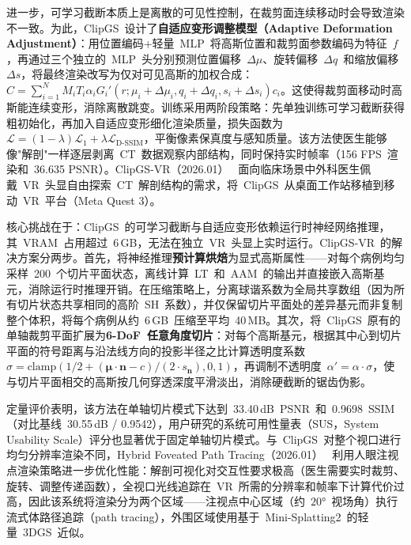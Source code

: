 进一步，可学习截断本质上是离散的可见性控制，在裁剪面连续移动时会导致渲染不一致。为此，ClipGS~设计了\textbf{自适应变形调整模型（Adaptive Deformation Adjustment）}：用位置编码+轻量~MLP~将高斯位置和裁剪面参数编码为特征~$f$，再通过三个独立的~MLP~头分别预测位置偏移~$\Delta\mu$、旋转偏移~$\Delta q$~和缩放偏移~$\Delta s$，将最终渲染改写为仅对可见高斯的加权合成：$C = \sum_{i=1}^{N} M_i T_i \alpha_i G_i'(r; \mu_i + \Delta\mu_i, q_i + \Delta q_i, s_i + \Delta s_i) c_i$。这使得裁剪面移动时高斯能连续变形，消除离散跳变。训练采用两阶段策略：先单独训练可学习截断获得粗初始化，再加入自适应变形细化渲染质量，损失函数为~$\mathcal{L} = (1-\lambda)\mathcal{L}_1 + \lambda \mathcal{L}_{\text{D-SSIM}}$，平衡像素保真度与感知质量。该方法使医生能够像"解剖"一样逐层剥离~CT~数据观察内部结构，同时保持实时帧率（156 FPS~渲染和~36.635 PSNR）。ClipGS-VR（2026.01）~\cite{2601_19310} 面向临床场景中外科医生佩戴~VR~头显自由探索~CT~解剖结构的需求，将~ClipGS~从桌面工作站移植到移动~VR~平台（Meta Quest 3）。

核心挑战在于：ClipGS~的可学习截断与自适应变形依赖运行时神经网络推理，其~VRAM~占用超过~6\,GB，无法在独立~VR~头显上实时运行。ClipGS-VR~的解决方案分两步。首先，将神经推理\textbf{预计算烘焙}为显式高斯属性——对每个病例均匀采样~200~个切片平面状态，离线计算~LT~和~AAM~的输出并直接嵌入高斯基元，消除运行时推理开销。在压缩策略上，分离球谐系数为全局共享数组（因为所有切片状态共享相同的高阶~SH~系数），并仅保留切片平面处的差异基元而非复制整个体积，将每个病例从约~6\,GB~压缩至平均~40\,MB。其次，将~ClipGS~原有的单轴裁剪平面扩展为\textbf{6-DoF~任意角度切片}：对每个高斯基元，根据其中心到切片平面的符号距离与沿法线方向的投影半径之比计算透明度系数~$\sigma = \text{clamp}(1/2 + (\mathbf{\mu} \cdot \mathbf{n} - c)/(2 \cdot s_{\mathbf{n}}), 0, 1)$，再调制不透明度~$\alpha' = \alpha \cdot \sigma$，使与切片平面相交的高斯按几何穿透深度平滑淡出，消除硬截断的锯齿伪影。

定量评价表明，该方法在单轴切片模式下达到~33.40\,dB~PSNR~和~0.9698~SSIM（对比基线~30.55\,dB / 0.9542），用户研究的系统可用性量表（SUS，System Usability Scale）评分也显著优于固定单轴切片模式。与~ClipGS~对整个视口进行均匀分辨率渲染不同，Hybrid Foveated Path Tracing（2026.01）~\cite{2601_22026} 利用人眼注视点渲染策略进一步优化性能：解剖可视化对交互性要求极高（医生需要实时裁剪、旋转、调整传递函数），全视口光线追踪在~VR~所需的分辨率和帧率下计算代价过高，因此该系统将渲染分为两个区域——注视点中心区域（约~$20°$~视场角）执行流式体路径追踪（path tracing），外围区域使用基于~Mini-Splatting2~的轻量~3DGS~近似。

